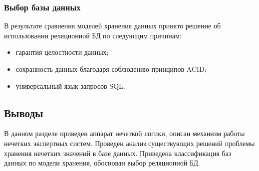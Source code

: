 \subsubsection{Выбор базы данных}
В результате сравнения моделей хранения данных принято решение об использовании реляционной БД по следующим причинам:
\begin{itemize}
	\item гарантия целостности данных;
	\item сохранность данных благодаря соблюдению принципов ACID;
	\item универсальный язык запросов SQL.
\end{itemize}
%

\subsection{Выводы}
В данном разделе приведен аппарат нечеткой логики, описан механизм работы нечетких экспертных систем. Проведен анализ существующих решений проблемы хранения нечетких значений в базе данных. Приведена классификация баз данных по модели хранения, обоснован выбор реляционной БД.
\pagebreak